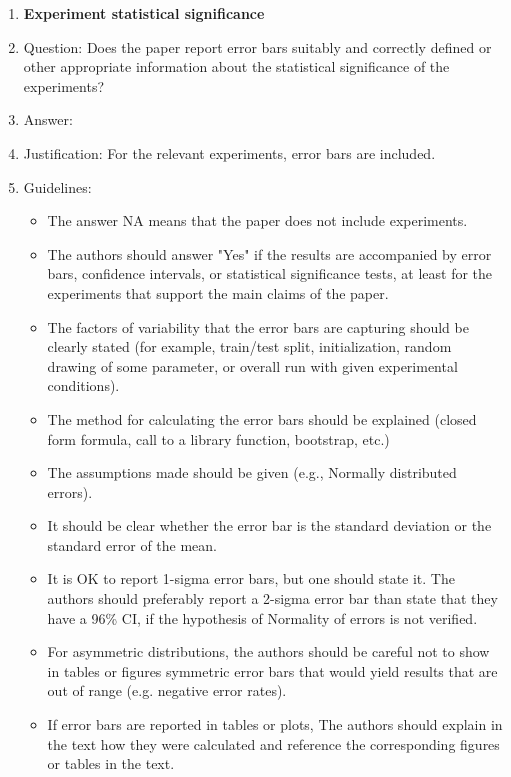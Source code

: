 \documentclass{article}
\theoremstyle{definition} \newtheorem{definition}{Definition}  \newtheorem{example}{Example}
\theoremstyle{remark} \newtheorem{remark}{Remark}
\newcounter{ct}
\begin{document}
\begin{enumerate}
\item {\bf Experiment statistical significance}
    \item[] Question: Does the paper report error bars suitably and correctly defined or other appropriate information about the statistical significance of the experiments?
    \item[] Answer: \answerYes{} %
    \item[] Justification: For the relevant experiments, error bars are included.
    \item[] Guidelines:
    \begin{itemize}
        \item The answer NA means that the paper does not include experiments.
        \item The authors should answer "Yes" if the results are accompanied by error bars, confidence intervals, or statistical significance tests, at least for the experiments that support the main claims of the paper.
        \item The factors of variability that the error bars are capturing should be clearly stated (for example, train/test split, initialization, random drawing of some parameter, or overall run with given experimental conditions).
        \item The method for calculating the error bars should be explained (closed form formula, call to a library function, bootstrap, etc.)
        \item The assumptions made should be given (e.g., Normally distributed errors).
        \item It should be clear whether the error bar is the standard deviation or the standard error of the mean.
        \item It is OK to report 1-sigma error bars, but one should state it. The authors should preferably report a 2-sigma error bar than state that they have a 96\% CI, if the hypothesis of Normality of errors is not verified.
        \item For asymmetric distributions, the authors should be careful not to show in tables or figures symmetric error bars that would yield results that are out of range (e.g. negative error rates).
        \item If error bars are reported in tables or plots, The authors should explain in the text how they were calculated and reference the corresponding figures or tables in the text.
    \end{itemize}


\end{enumerate}
\end{document}

